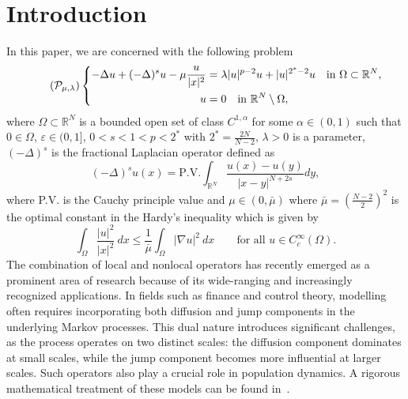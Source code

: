 \documentclass[11pt]{article}
\newcommand{\al} {\alpha}
\newcommand{\om} {\Omega}
\newcommand{\la} {\lambda}
\newcommand{\rnn}{\mathbb{R}^{N}}
\newcommand{\grad}{\nabla}
\begin{document}
\section{Introduction}
In this paper, we are concerned with the following problem
\begin{equation}\label{eq:main_problem} \tag{$\mathcal{P}_{\mu,\lambda}$}
\left\{
\begin{aligned}
    -\Delta u + (-\Delta)^s u - \mu \frac{u}{|x|^2} &= \lambda |u|^{p-2} u + |u|^{2^*-2} u \quad \text{in } \Omega \subset \mathbb{R}^N, \\
    u &= 0 \quad \text{in } \mathbb{R}^N \setminus \Omega,
\end{aligned}
\right.
\end{equation}
where $\om \subset \rnn$ is a bounded open set of class $C^{1,\al}$ for some $\al \in (0,1)$ such that $0 \in \om$, $\varepsilon \in (0,1]$, $0<s<1<p<2^*$ with $2^* = \frac{2N}{N-2}$, $\la >0$ is a parameter, $(-\Delta)^s$ is the fractional Laplacian operator defined as 
\begin{equation*}
    (-\Delta )^s u (x) = \text{P.V.} \int_{\rnn} \frac{u(x) - u(y)}{|x-y|^{N+2s}} dy, 
\end{equation*}
where P.V. is the Cauchy principle value and $\mu \in (0, \bar \mu)$ where $\bar \mu = \left( \frac{N-2}{2} \right)^2$ is the optimal constant in the Hardy's inequality \cite{adimurthi_hardy_inequality} which is given by
\begin{equation*}
     \int_{\om} \frac{|u|^2}{|x|^2}~ dx \leq \frac{1}{\bar \mu} \int_{\om} |\grad u |^2 ~ dx \qquad \text{for all } u \in C_c^{\infty}(\om).
\end{equation*}
The combination of local and nonlocal operators has recently emerged as a prominent area of research because of its wide-ranging and increasingly recognized applications. In fields such as finance and control theory, modelling often requires incorporating both diffusion and jump components in the underlying Markov processes. This dual nature introduces significant challenges, as the process operates on two distinct scales: the diffusion component dominates at small scales, while the jump component becomes more influential at larger scales. Such operators also play a crucial role in population dynamics. A rigorous mathematical treatment of these models can be found in~\cite{valdinoci_mixed_application}. 
\end{document}
